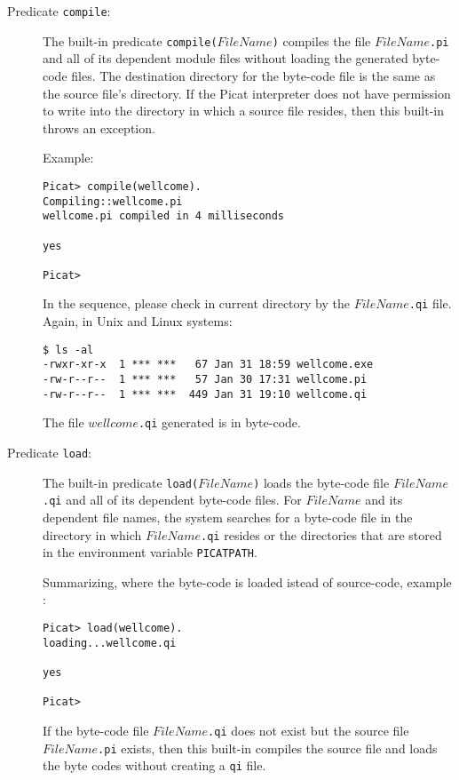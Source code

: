 \begin{description}
\item[Predicate \texttt{compile}:]
The built-in predicate \texttt{compile($FileName$)} compiles the file \texttt{$FileName$.pi} and all of its dependent module files without loading the generated byte-code files. The destination directory for the byte-code file is the same as the source file's directory. If the Picat interpreter does not have permission to write into the directory in which a source file resides, then this built-in throws an exception. 

Example:

\begin{verbatim}
Picat> compile(wellcome).   
Compiling::wellcome.pi
wellcome.pi compiled in 4 milliseconds

yes

Picat>
\end{verbatim}

In the sequence, please check in current directory by the
\texttt{$FileName$.qi} file. Again, in Unix and Linux
systems:


\begin{verbatim}
$ ls -al
-rwxr-xr-x  1 *** ***   67 Jan 31 18:59 wellcome.exe
-rw-r--r--  1 *** ***   57 Jan 30 17:31 wellcome.pi
-rw-r--r--  1 *** ***  449 Jan 31 19:10 wellcome.qi
\end{verbatim}

The file \texttt {$wellcome$.qi} generated is in byte-code.


\item[Predicate \texttt{load}:]
The built-in predicate \texttt{load($FileName$)} loads the byte-code file \texttt{$FileName$.qi} and all of its dependent byte-code files. For $FileName$ and its dependent file names,  the system searches for a byte-code file in the directory in which \texttt{$FileName$.qi} resides or the directories that are stored in the environment variable \texttt{PICATPATH}. 

Summarizing, where the byte-code is loaded istead of source-code, example :

\begin{verbatim}
Picat> load(wellcome).   
loading...wellcome.qi

yes

Picat>
\end{verbatim}


If the byte-code file \texttt{$FileName$.qi} does not exist but the source file \texttt{$FileName$.pi} exists, then this built-in compiles the source file and loads the byte codes without creating a {\tt qi} file.



\end{description}

